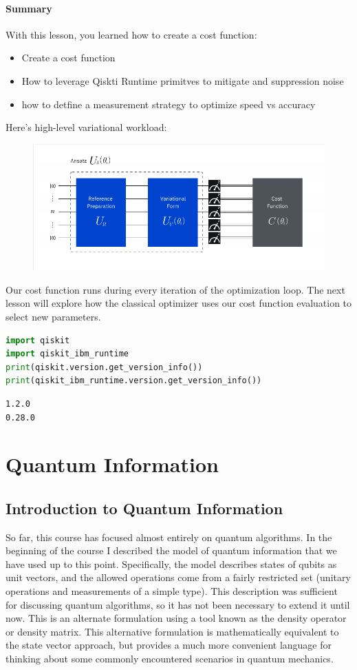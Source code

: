 \documentclass[12pt, oneside]{book}
\theoremstyle{definition}
\theoremstyle{definition}
\theoremstyle{remark}
\begin{document}
\subsection{Summary}
With this lesson, you learned how to create a cost function:
\begin{itemize}
    \item Create a cost function
    \item How to leverage Qiskti Runtime primitves to mitigate and suppression noise
    \item how to detfine a measurement strategy to optimize speed vs accuracy
\end{itemize}
Here's high-level variational workload:
\begin{figure}[H]
    \centering
    \includegraphics[width=0.75\linewidth]{../images/summ_cost.png}
\end{figure}
Our cost function runs during every iteration of the optimization loop. The next lesson will explore how the classical optimizer uses our cost function evaluation to select new parameters.
\begin{lstlisting}[language=Python]
import qiskit
import qiskit_ibm_runtime
print(qiskit.version.get_version_info())
print(qiskit_ibm_runtime.version.get_version_info())
\end{lstlisting}
\begin{lstlisting}
1.2.0
0.28.0
\end{lstlisting}

\part{Quantum Information}
\chapter{Introduction to Quantum Information}
So far, this course has focused almost entirely on quantum algorithms. In the beginning of the course I described the model of quantum information that we have used up to this point. Specifically, the model describes states of qubits as unit vectors, and the allowed operations come from a fairly restricted set (unitary operations and measurements of a simple type). This description was sufficient for discussing quantum algorithms, so it has not been necessary to extend it until now. This is an alternate formulation using a tool known as the density operator or density matrix. This alternative formulation is mathematically equivalent to the state vector approach, but provides a much more convenient language for thinking about some commonly encountered scenarios in quantum mechanics.
\end{document}

